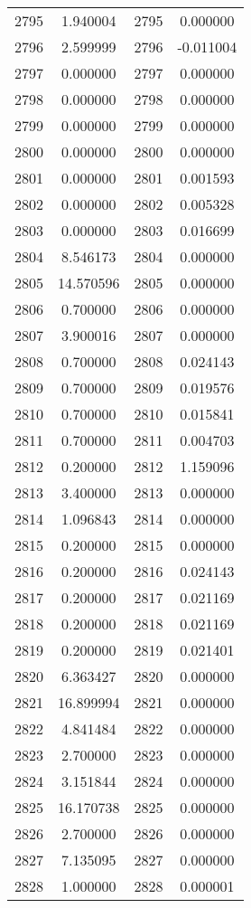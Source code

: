 \documentclass[12pt]{article}
\begin{document}
\begin{longtable}{@{}cccc@{}}
2795 & 1.940004 & 2795 & 0.000000 \\
2796 & 2.599999 & 2796 & -0.011004 \\
2797 & 0.000000 & 2797 & 0.000000 \\
2798 & 0.000000 & 2798 & 0.000000 \\
2799 & 0.000000 & 2799 & 0.000000 \\
2800 & 0.000000 & 2800 & 0.000000 \\
2801 & 0.000000 & 2801 & 0.001593 \\
2802 & 0.000000 & 2802 & 0.005328 \\
2803 & 0.000000 & 2803 & 0.016699 \\
2804 & 8.546173 & 2804 & 0.000000 \\
2805 & 14.570596 & 2805 & 0.000000 \\
2806 & 0.700000 & 2806 & 0.000000 \\
2807 & 3.900016 & 2807 & 0.000000 \\
2808 & 0.700000 & 2808 & 0.024143 \\
2809 & 0.700000 & 2809 & 0.019576 \\
2810 & 0.700000 & 2810 & 0.015841 \\
2811 & 0.700000 & 2811 & 0.004703 \\
2812 & 0.200000 & 2812 & 1.159096 \\
2813 & 3.400000 & 2813 & 0.000000 \\
2814 & 1.096843 & 2814 & 0.000000 \\
2815 & 0.200000 & 2815 & 0.000000 \\
2816 & 0.200000 & 2816 & 0.024143 \\
2817 & 0.200000 & 2817 & 0.021169 \\
2818 & 0.200000 & 2818 & 0.021169 \\
2819 & 0.200000 & 2819 & 0.021401 \\
2820 & 6.363427 & 2820 & 0.000000 \\
2821 & 16.899994 & 2821 & 0.000000 \\
2822 & 4.841484 & 2822 & 0.000000 \\
2823 & 2.700000 & 2823 & 0.000000 \\
2824 & 3.151844 & 2824 & 0.000000 \\
2825 & 16.170738 & 2825 & 0.000000 \\
2826 & 2.700000 & 2826 & 0.000000 \\
2827 & 7.135095 & 2827 & 0.000000 \\
2828 & 1.000000 & 2828 & 0.000001 \\

\end{longtable}
\end{document}
